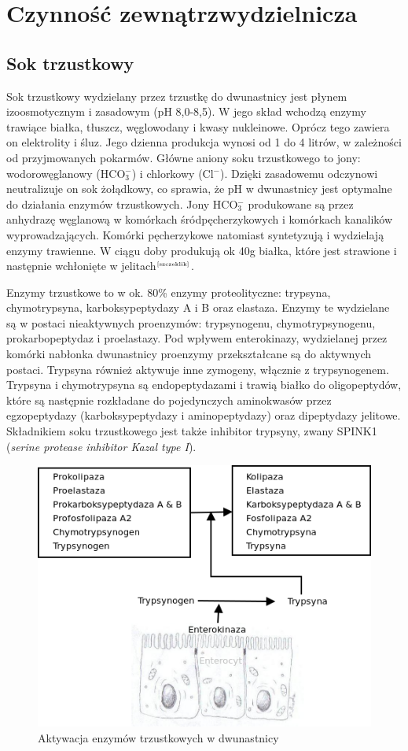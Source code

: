 \documentclass[a4paper, 12pt]{report}
\newcommand\cyt[1]{$^{\tiny{\cite{#1}}}$}
\begin{document}
\section{Czynność zewnątrzwydzielnicza}
\subsection{Sok trzustkowy}
Sok trzustkowy wydzielany przez trzustkę do dwunastnicy jest płynem
izoosmotycznym i zasadowym (pH 8,0-8,5). W jego skład wchodzą enzymy
trawiące białka, tłuszcz, węglowodany i kwasy nukleinowe. Oprócz tego
zawiera on elektrolity i śluz. Jego dzienna produkcja wynosi od 1 do 4
litrów, w zależności od przyjmowanych pokarmów. Główne aniony soku
trzustkowego to jony: wodorowęglanowy (HCO$_3^-$) i chlorkowy
(Cl$^-$). Dzięki zasadowemu odczynowi neutralizuje on sok żołądkowy, 
co sprawia, że pH w dwunastnicy jest optymalne do działania enzymów
trzustkowych. Jony HCO$_3^-$ produkowane są przez anhydrazę węglanową
w komórkach śródpęcherzykowych i komórkach kanalików wyprowadzających.
Komórki pęcherzykowe natomiast syntetyzują i wydzielają enzymy
trawienne. W ciągu doby produkują ok 40g białka, które jest strawione
i następnie wchłonięte w jelitach\cyt{szczeklik}.

Enzymy trzustkowe to w ok. 80\% enzymy proteolityczne: trypsyna,
chymotrypsyna, karboksypeptydazy A i B oraz elastaza. Enzymy te
wydzielane są w postaci nieaktywnych proenzymów: trypsynogenu,
chymotrypsynogenu, prokarbopeptydaz i proelastazy. Pod wpływem
enterokinazy, wydzielanej przez komórki nabłonka dwunastnicy proenzymy
przekształcane są do aktywnych postaci. Trypsyna również aktywuje inne
zymogeny, włącznie z trypsynogenem. Trypsyna i chymotrypsyna są
endopeptydazami i trawią białko do oligopeptydów, które są następnie
rozkładane do pojedynczych aminokwasów przez egzopeptydazy
(karboksypeptydazy i aminopeptydazy) oraz dipeptydazy
jelitowe. Składnikiem soku trzustkowego jest także inhibitor trypsyny,
zwany SPINK1 (\textsl{serine protease inhibitor Kazal type I}).

\begin{figure}[!h]
\centering
\includegraphics[scale=0.4]{pan-enz}
\caption{Aktywacja enzymów trzustkowych w dwunastnicy}
\end{figure}
\end{document}
